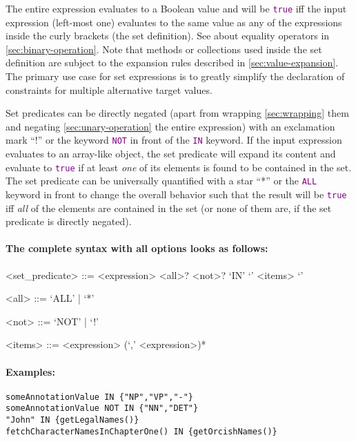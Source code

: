 \documentclass[11pt]{article}
\newcommand{\keyword}[1]{\textcolor{purple}{\texttt{#1}}}
\begin{document}
\noindent The entire expression evaluates to a Boolean value and will be \keyword{true} iff the input expression (left-most one) evaluates to the same value as any of the expressions inside the curly brackets (the set definition). See about equality operators in \cref{sec:binary-operation}. Note that methods or collections used inside the set definition are subject to the expansion rules described in \cref{sec:value-expansion}. The primary use case for set expressions is to greatly simplify the declaration of constraints for multiple alternative target values. 

Set predicates can be directly negated (apart from wrapping \ref{sec:wrapping} them and negating \ref{sec:unary-operation} the entire expression) with an exclamation mark ``!'' or the keyword \keyword{NOT} in front of the \keyword{IN} keyword. If the input expression evaluates to an array-like object, the set predicate will expand its content and evaluate to \keyword{true} if at least \textit{one} of its elements is found to be contained in the set. The set predicate can be universally quantified with a star ``*'' or the \keyword{ALL} keyword in front to change the overall behavior such that the result will be \keyword{true} iff \textit{all} of the elements are contained in the set (or none of them are, if the set predicate is directly negated).

\paragraph{The complete syntax with all options looks as follows:}
\begin{grammar}	
	<set_predicate> ::= <expression> <all>? <not>? `IN' `{' <items> `}'
	
	<all> ::=  `ALL' | `*'
	
	<not> ::=  `NOT' | `!'
	
	<items> ::= <expression> (`,' <expression>)*
\end{grammar}

\paragraph{Examples:}

\begin{verbatim}
someAnnotationValue IN {"NP","VP","-"}
someAnnotationValue NOT IN {"NN","DET"}
"John" IN {getLegalNames()}
fetchCharacterNamesInChapterOne() IN {getOrcishNames()}
\end{verbatim}
\end{document}
